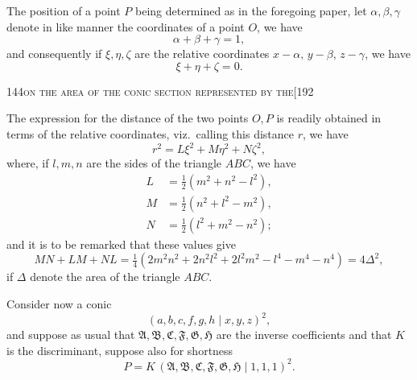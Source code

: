 \documentclass[11pt]{article}
\begin{document}

The position of a point $P$ being determined as in the foregoing paper, let $\alpha, \beta, \gamma$ denote in like manner the coordinates of a point $O$, we have
\[
\alpha + \beta + \gamma = 1,
\]
and consequently if $\xi, \eta, \zeta$ are the relative coordinates $x - \alpha,\, y - \beta,\, z - \gamma$, we have
\[
\xi + \eta + \zeta = 0.
\]

\bigskip

\begin{center}\small 144\hfill\textsc{on the area of the conic section represented by the}\hfill [192\end{center}

\medskip

The expression for the distance of the two points $O, P$ is readily obtained in terms of the relative coordinates, viz.\ calling this distance $r$, we have
\[
r^{2} = L\xi^{2} + M\eta^{2} + N\zeta^{2},
\]
where, if $l, m, n$ are the sides of the triangle $ABC$, we have
\begin{align*}
L &= \tfrac{1}{2}(m^{2} + n^{2} - l^{2}),\\
M &= \tfrac{1}{2}(n^{2} + l^{2} - m^{2}),\\
N &= \tfrac{1}{2}(l^{2} + m^{2} - n^{2});
\end{align*}
and it is to be remarked that these values give
\[
MN + LM + NL = \tfrac{1}{4}\left(2m^{2}n^{2} + 2n^{2}l^{2} + 2l^{2}m^{2} - l^{4} - m^{4} - n^{4}\right) = 4\Delta^{2},
\]
if $\Delta$ denote the area of the triangle $ABC$.

Consider now a conic
\[
(a, b, c, f, g, h \mid x, y, z)^{2},
\]
and suppose as usual that $\mathfrak{A}, \mathfrak{B}, \mathfrak{C}, \mathfrak{F}, \mathfrak{G}, \mathfrak{H}$ are the inverse coefficients and that $K$ is the discriminant, suppose also for shortness
\[
P = K\, (\mathfrak{A}, \mathfrak{B}, \mathfrak{C}, \mathfrak{F}, \mathfrak{G}, \mathfrak{H} \mid 1, 1, 1)^{2}.
\]
\end{document}
